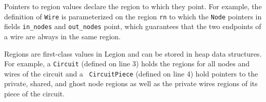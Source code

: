Pointers to region values declare the region to which they point.  For
example, the definition of {\tt Wire} is parameterized on the region
{\tt rn} to which the {\tt Node} pointers in fields {\tt in\_nodes}
and {\tt out\_nodes} point, which guarantees that the two endpoints of
a wire are always in the same region.

Regions are first-class values in Legion and can be stored in heap
data structures.  For example, a {\tt Circuit} (defined on line 3)
holds the regions for all nodes and wires of the circuit and a {\tt
  CircuitPiece} (defined on line 4) hold pointers to the private,
shared, and ghost node regions as well as the private wires regions of its piece of
the circuit.





%

%
%
